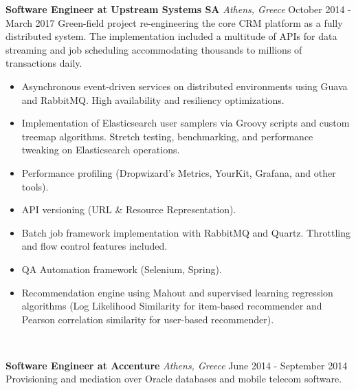 \documentclass{article}
\begin{document}
        \begin{flushleft}
            \textbf{\large Software Engineer at Upstream Systems SA} \textit{\footnotesize Athens, Greece} \hfill \small October 2014 - March 2017   \newline 
		Green-field project re-engineering the core CRM platform as a fully distributed system. The implementation included a multitude of APIs for data streaming and job scheduling accommodating thousands to millions of transactions daily. 
            \newline
            \begin{itemize}
                \item Asynchronous event-driven services on distributed environments using Guava and RabbitMQ. High availability and resiliency optimizations.
			\item Implementation of Elasticsearch user samplers via Groovy scripts and custom treemap algorithms. Stretch testing, benchmarking, and performance tweaking on Elasticsearch operations.
			\item Performance profiling (Dropwizard’s Metrics, YourKit, Grafana, and other tools).
			\item API versioning (URL \& Resource Representation).
			\item Batch job framework implementation with RabbitMQ and Quartz. Throttling and flow control features included.
                \item QA Automation framework (Selenium, Spring).
			\item Recommendation engine using Mahout and supervised learning regression algorithms (Log Likelihood Similarity for item-based recommender and Pearson correlation similarity for user-based recommender).
            \end{itemize}
		                           \\ [1ex]
        \end{flushleft}

        \begin{flushleft}
            \textbf{\large Software Engineer at Accenture} \textit{\footnotesize Athens, Greece} \hfill \small June 2014 - September 2014  \newline
		Provisioning and mediation over Oracle databases and mobile telecom software. \newline
		   \\ [1ex]
        \end{flushleft}
\end{document}
